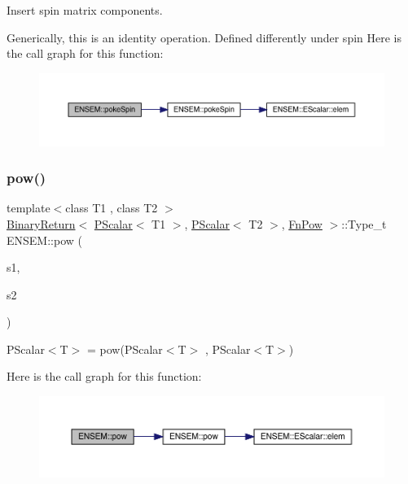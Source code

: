 Insert spin matrix components. 

Generically, this is an identity operation. Defined differently under spin Here is the call graph for this function\+:\nopagebreak
\begin{figure}[H]
\begin{center}
\leavevmode
\includegraphics[width=350pt]{db/dcc/group__primscalar_gafc9650865b3cf15e32d79e07d1c01eff_cgraph}
\end{center}
\end{figure}
\mbox{\label{group__primscalar_ga28323c8753f21f37983319d38eea45ee}} 
\subsubsection{\texorpdfstring{pow()}{pow()}}
{\footnotesize\ttfamily template$<$class T1 , class T2 $>$ \\
\mbox{\hyperlink{structENSEM_1_1BinaryReturn}{Binary\+Return}}$<$ \mbox{\hyperlink{classENSEM_1_1PScalar}{P\+Scalar}}$<$ T1 $>$, \mbox{\hyperlink{classENSEM_1_1PScalar}{P\+Scalar}}$<$ T2 $>$, \mbox{\hyperlink{structENSEM_1_1FnPow}{Fn\+Pow}} $>$\+::Type\+\_\+t E\+N\+S\+E\+M\+::pow (\begin{DoxyParamCaption}\item[{const \mbox{\hyperlink{classENSEM_1_1PScalar}{P\+Scalar}}$<$ T1 $>$ \&}]{s1,  }\item[{const \mbox{\hyperlink{classENSEM_1_1PScalar}{P\+Scalar}}$<$ T2 $>$ \&}]{s2 }\end{DoxyParamCaption})\hspace{0.3cm}{\ttfamily [inline]}}



P\+Scalar$<$\+T$>$ = pow(\+P\+Scalar$<$\+T$>$ , P\+Scalar$<$\+T$>$) 

Here is the call graph for this function\+:\nopagebreak
\begin{figure}[H]
\begin{center}
\leavevmode
\includegraphics[width=350pt]{db/dcc/group__primscalar_ga28323c8753f21f37983319d38eea45ee_cgraph}
\end{center}
\end{figure}
\mbox{\label{group__primscalar_ga1d9173117dec6193e9c26c211973310b}} 
